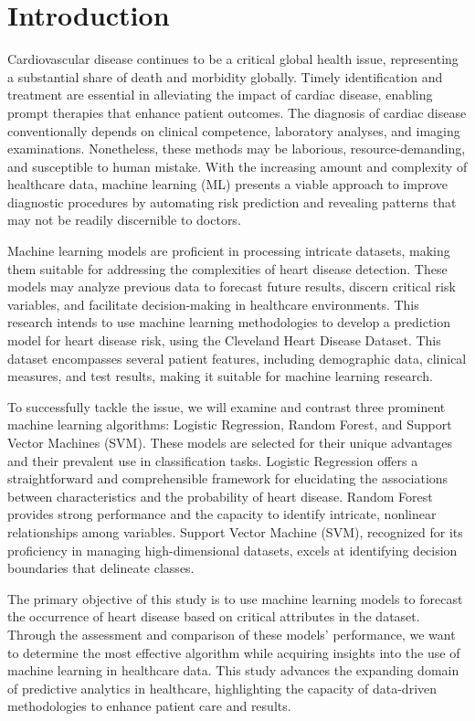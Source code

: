 \section{Introduction}

Cardiovascular disease continues to be a critical global health issue, representing a substantial share of death and morbidity globally. Timely identification and treatment are essential in alleviating the impact of cardiac disease, enabling prompt therapies that enhance patient outcomes. The diagnosis of cardiac disease conventionally depends on clinical competence, laboratory analyses, and imaging examinations. Nonetheless, these methods may be laborious, resource-demanding, and susceptible to human mistake. With the increasing amount and complexity of healthcare data, machine learning (ML) presents a viable approach to improve diagnostic procedures by automating risk prediction and revealing patterns that may not be readily discernible to doctors.

Machine learning models are proficient in processing intricate datasets, making them suitable for addressing the complexities of heart disease detection. These models may analyze previous data to forecast future results, discern critical risk variables, and facilitate decision-making in healthcare environments. This research intends to use machine learning methodologies to develop a prediction model for heart disease risk, using the Cleveland Heart Disease Dataset. This dataset encompasses several patient features, including demographic data, clinical measures, and test results, making it suitable for machine learning research.

To successfully tackle the issue, we will examine and contrast three prominent machine learning algorithms: Logistic Regression, Random Forest, and Support Vector Machines (SVM). These models are selected for their unique advantages and their prevalent use in classification tasks. Logistic Regression offers a straightforward and comprehensible framework for elucidating the associations between characteristics and the probability of heart disease. Random Forest provides strong performance and the capacity to identify intricate, nonlinear relationships among variables. Support Vector Machine (SVM), recognized for its proficiency in managing high-dimensional datasets, excels at identifying decision boundaries that delineate classes.

The primary objective of this study is to use machine learning models to forecast the occurrence of heart disease based on critical attributes in the dataset. Through the assessment and comparison of these models' performance, we want to determine the most effective algorithm while acquiring insights into the use of machine learning in healthcare data. This study advances the expanding domain of predictive analytics in healthcare, highlighting the capacity of data-driven methodologies to enhance patient care and results.
